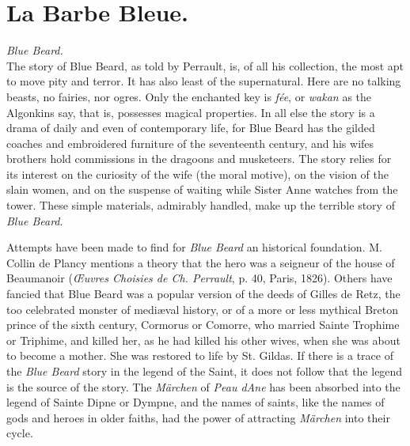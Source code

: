 \documentclass[14pt,a4paper]{memoir}
\newcommand{\notesection}[1]{%
  \addtonotes{\protect\par\protect\vspace{2ex}\protect\noindent\textbf{#1}\protect\par\protect\vspace{1ex}}%
}
\begin{document}
{\section{La Barbe Bleue.}
\notesection{La Barbe Bleue.}

\emph{Blue Beard.} \\

The story of Blue Beard, as told by Perrault, is, of all his collection,
the most apt to move pity and terror. It has also least of the
supernatural. Here are no talking beasts, no fairies, nor ogres. Only
the enchanted key is \emph{fée}, or \emph{wakan} as the Algonkins say,
that is, possesses magical properties. In all else the story is a drama
of daily and even of contemporary life, for Blue Beard has the gilded
coaches and embroidered furniture of the seventeenth century, and his
wife\textquotesingle s brothers hold commissions in the dragoons and
musketeers. The story relies for its interest on the curiosity of the
wife (the moral motive), on the vision of the slain women, and on the
suspense of waiting while Sister Anne watches from the tower. These
simple materials, admirably handled, make up the terrible story of
\emph{Blue Beard}.

Attempts have been made to find for \emph{Blue Beard} an historical
foundation. M. Collin de Plancy mentions a theory that the hero was a
seigneur of the house of Beaumanoir (\emph{Œuvres Choisies de Ch.
Perrault}, p. 40, Paris, 1826). Others have fancied that Blue Beard was
a popular version of the deeds of Gilles de Retz, the too celebrated
monster of mediæval history, or of a more or less mythical Breton prince
of the sixth century, Cormorus or Comorre, who married Sainte Trophime
or Triphime, and killed her, as he had killed his other wives, when she
was about to become a mother. She was restored to life by St.
Gildas.
If there is a trace of the \emph{Blue Beard} story in the legend of the
Saint, it does not follow that the legend is the source of the story.
The \emph{Märchen} of \emph{Peau d\textquotesingle Ane} has been
absorbed into the legend of Sainte Dipne or Dympne, and the names of
saints, like the names of gods and heroes in older faiths, had the power
of attracting \emph{Märchen} into their cycle.

}
\end{document}
